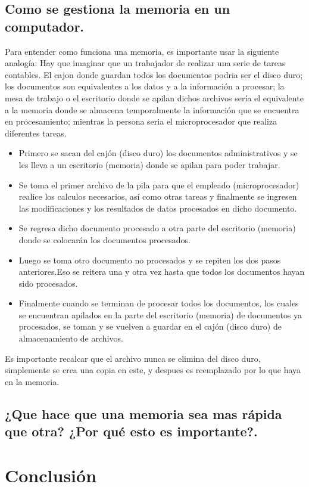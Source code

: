 \documentclass{article}
\begin{document}
\subsection{Como se gestiona la memoria en un computador.}
Para entender como funciona una memoria, es importante usar la siguiente analogía: Hay que imaginar que un trabajador de realizar una serie de tareas contables. El cajon donde guardan todos los documentos podria ser el disco duro; los documentos son equivalentes a los datos y a la información a procesar; la mesa de trabajo o el escritorio donde se apilan dichos archivos sería el equivalente a la memoria donde se almacena temporalmente la información que se encuentra en procesamiento; mientras la persona seria el microprocesador que realiza diferentes tareas.
\begin{itemize}
    \item Primero se sacan del cajón (disco duro) los documentos administrativos y se les lleva a un escritorio (memoria) donde se apilan para poder trabajar.
    \item Se toma el primer archivo de la pila para que el empleado (microprocesador) realice los calculos necesarios, así como otras tareas y finalmente se ingresen las modificaciones y los resultados de datos procesados en dicho documento.
    \item Se regresa dicho documento procesado a otra parte del escritorio (memoria) donde se colocarán los documentos procesados.
    \item Luego se toma otro documento no procesados y se repiten los dos pasos anteriores.Eso se reitera una y otra vez hasta que todos los documentos hayan sido procesados. 
    \item Finalmente cuando se terminan de procesar todos los documentos, los cuales se encuentran apilados en la parte del escritorio (memoria) de documentos ya procesados, se toman y se vuelven a guardar en el cajón (disco duro) de almacenamiento de archivos. 
  \end{itemize}  
    Es importante recalcar que el archivo nunca se elimina del disco duro, simplemente se crea una copia en este, y despues es reemplazado por lo que haya en la memoria. \cite{taller}

\subsection{¿Que hace que una memoria sea mas rápida que otra? ¿Por qué esto es importante?. }













\section{Conclusión} \label{conclulsion}



\end{document}
